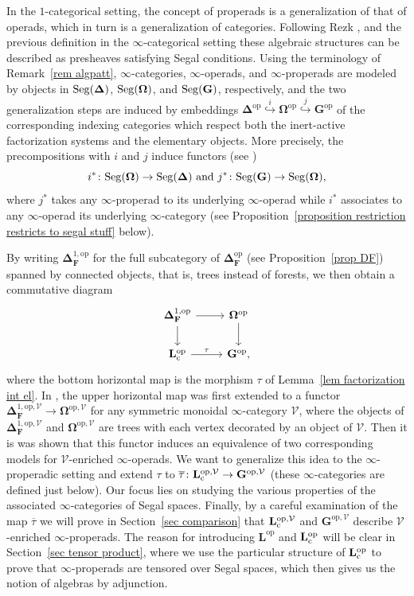 \documentclass{amsart}
\numberwithin{theorem}{subsection}
\theoremstyle{definition}
\providecommand{\op}{\mathrm{op}}
\newcommand{\finsetskel}{\mathbf{F}}
\newcommand{\xV}{\mathcal{V}}
\newcommand{\name}[1]{\ensuremath{\text{\textup{#1}}}}
\newcommand{\simp}{\mathbf{\Delta}}
\newcommand{\bbO}{\mathbf{\Omega}}
\newcommand{\levelg}{\mathbf{L}}
\newcommand{\levelgconn}{\levelg_{\name{c}}}
\newcommand{\oplevelcV}{\levelgconn^{\op,\xV}}
\newcommand{\bbY}{\mathbf{G}}
\newcommand{\opbbYV}{\bbY^{\op,\xV}}
\newcommand{\bartau}{\overline{\tau}}
\newcommand{\Seg}{\name{Seg}}
\begin{document}
In the $1$-categorical setting, the concept of properads is a generalization of that of operads, which in turn is a generalization of categories. 
Following Rezk \cite{Rezk}, \cite{CisinkiMoerdijk2} and the previous definition in the $\infty$-categorical setting these algebraic structures can be described as presheaves satisfying Segal conditions. 
Using the terminology of Remark~\ref{rem algpatt}, $\infty$-categories, $\infty$-operads, and $\infty$-properads are modeled by objects in $\Seg(\simp)$, $\Seg(\bbO)$, and $\Seg(\bbY)$, respectively, and the two generalization steps are induced by embeddings $\simp^{\op} \overset{i}{\hookrightarrow} \bbO^\op \overset{j}{\hookrightarrow} \bbY^\op $ of the corresponding indexing categories which respect both the inert-active factorization systems and the elementary objects. 
More precisely, the precompositions with $i$ and $j$ induce functors (see \cite[Lemma 4.5]{patterns1})
\[i^*\colon \Seg(\bbO)\to \Seg(\simp)\text{ and } j^*\colon \Seg(\bbY)\to \Seg(\bbO),\]
where $j^*$ takes any $\infty$-properad to its underlying $\infty$-operad while $i^*$ associates to any $\infty$-operad its underlying $\infty$-category
(see Proposition~\ref{proposition restriction restricts to segal stuff} below).

By writing $\simp_{\finsetskel}^{1, \op}$ for the full subcategory of $\simp_{\finsetskel}^{\op}$ (see Proposition~\ref{prop DF}) spanned by connected objects, that is, trees instead of forests, we then obtain a commutative diagram
\[
\begin{tikzcd}
\simp_{\finsetskel}^{1,\op} \arrow{r}\arrow{d} & \bbO ^\op \arrow{d}\\
\levelgconn^\op \arrow {r}{\tau} & \bbY^\op,
\end{tikzcd}
\]
where the bottom horizontal map is the morphism $\tau$ of Lemma~\ref{lem factorization int el}.
In \cite{ChuHaugseng}, the upper horizontal map was first extended to a functor $\simp_{\finsetskel}^{1,\op, \xV}\to \bbO^{\op,\xV}$ for any symmetric monoidal $\infty$-category $\xV$, where the objects of $\simp_{\finsetskel}^{1,\op, \xV}$ and $\bbO^{\op,\xV}$ are trees with each vertex decorated by an object of $\xV$.
Then it is was shown that this functor induces an equivalence of two corresponding models for $\xV$-enriched $\infty$-operads. 
We want to generalize this idea to the $\infty$-properadic setting and extend $\tau$ to $\bartau \colon \oplevelcV \to \opbbYV$ (these $\infty$-categories are defined just below). 
Our focus lies on studying the various properties of the associated $\infty$-categories of Segal spaces. 
Finally, by a careful examination of the map $\bartau$ we will prove in Section~\ref{sec comparison} that $\oplevelcV$ and $\opbbYV$ describe $\xV$-enriched $\infty$-properads.
The reason for introducing $\levelg^\op$ and $\levelgconn^\op$ will be clear in Section~\ref{sec tensor product}, where we use the particular structure of $\levelgconn^\op$ to prove that $\infty$-properads are tensored over Segal spaces, which then gives us the notion of algebras by adjunction.
\end{document}
